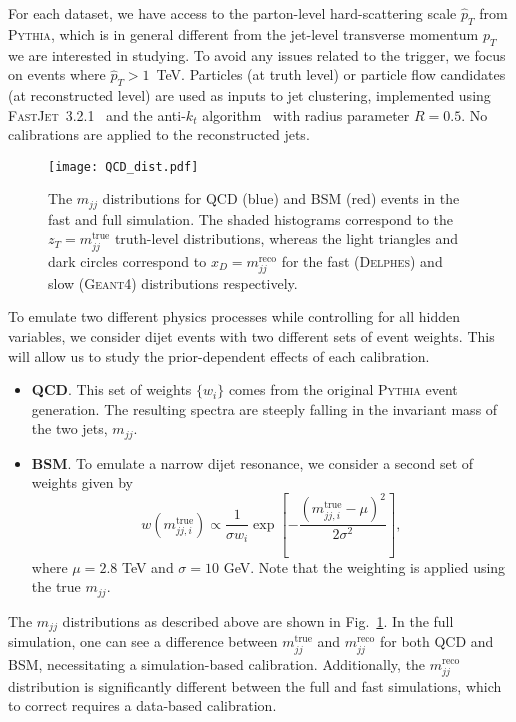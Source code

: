 \documentclass[aps,prd,reprint,preprintnumbers,superscriptaddress,nofootinbib,longbibliography,floatfix]{revtex4-1}
\DeclareRobustCommand{\Fig}[1]{Fig.~\ref{fig:#1}}
\begin{document}
For each dataset, we have access to the parton-level hard-scattering scale $\hat{p}_T$ from \textsc{Pythia}, which is in general different from the jet-level transverse momentum $p_T$ we are interested in studying.
%
To avoid any issues related to the trigger, we focus on events where $\hat{p}_T> 1$~TeV.
%
Particles (at truth level) or particle flow candidates (at reconstructed level) are used as inputs to jet clustering, implemented using \textsc{FastJet}~3.2.1~\cite{Cacciari:2011ma,Cacciari:2005hq} and the anti-$k_t$ algorithm~\cite{Cacciari:2008gp} with radius parameter $R=0.5$.
%
No calibrations are applied to the reconstructed jets.  

\begin{figure}[t]
    \centering
    \texttt{[image: QCD\_dist.pdf]}
    \caption{
    The $m_{jj}$ distributions for QCD (blue) and BSM (red) events in the fast and full simulation. The shaded histograms correspond to the $z_T = m^{\text{true}}_{jj}$ truth-level distributions, whereas the light triangles and dark circles correspond to $x_D = m^{\text{reco}}_{jj}$ for the fast (\textsc{Delphes}) and slow (\textsc{Geant4}) distributions respectively.}
    \label{fig:QCD_dijets}
\end{figure}

To emulate two different physics processes while controlling for all hidden variables, we consider dijet events with two different sets of event weights. 
%
This will allow us to study the prior-dependent effects of each calibration.
%
\begin{itemize}
    \item \textbf{QCD}.
    This set of weights $\{w_i\}$ comes from the original \textsc{Pythia} event generation.
    The resulting spectra are steeply falling in the invariant mass of the two jets, $m_{jj}$. 
    \item \textbf{BSM}.
    To emulate a narrow dijet resonance, we consider a second set of weights given by
    \begin{equation}
        w(m^\text{true}_{jj,i})\propto \frac{1}{\sigma w_i} \exp\left[-\frac{(m^\text{true}_{jj,i}-\mu)^2}{2\sigma^2} \right],
    \end{equation}
    where $\mu=2.8$ TeV and $\sigma=10$ GeV.
    Note that the weighting is applied using the true $m_{jj}$.
\end{itemize}
%
The $m_{jj}$ distributions as described above are shown in \Fig{QCD_dijets}.
%
In the full simulation, one can see a difference between $m^{\text{true}}_{jj}$ and $m^{\text{reco}}_{jj}$ for both QCD and BSM, necessitating a simulation-based calibration.
%
Additionally, the $m^{\text{reco}}_{jj}$ distribution is significantly different between the full and fast simulations, which to correct requires a data-based calibration.
\end{document}
